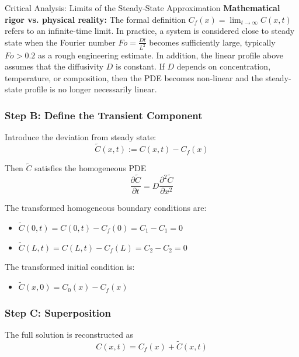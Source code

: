\begin{mainbox}{Critical Analysis: Limits of the Steady-State Approximation}
\textbf{Mathematical rigor vs. physical reality:} The formal definition $C_f(x)=\lim_{t\to\infty}C(x,t)$ refers to an infinite-time limit. In practice, a system is considered close to steady state when the Fourier number $Fo=\frac{Dt}{L^2}$ becomes sufficiently large, typically $Fo>0.2$ as a rough engineering estimate. In addition, the linear profile above assumes that the diffusivity $D$ is constant. If $D$ depends on concentration, temperature, or composition, then the PDE becomes non-linear and the steady-state profile is no longer necessarily linear.
\end{mainbox}

\subsubsection{Step B: Define the Transient Component}

Introduce the deviation from steady state:
\begin{equation}
    \tilde{C}(x,t):=C(x,t)-C_f(x)
\end{equation}

Then $\tilde{C}$ satisfies the homogeneous PDE
\begin{equation}
    \frac{\partial \tilde{C}}{\partial t}=D\frac{\partial^2 \tilde{C}}{\partial x^2}
\end{equation}

The transformed homogeneous boundary conditions are:
\begin{itemize}
    \item $\tilde{C}(0,t)=C(0,t)-C_f(0)=C_1-C_1=0$
    \item $\tilde{C}(L,t)=C(L,t)-C_f(L)=C_2-C_2=0$
\end{itemize}

The transformed initial condition is:
\begin{itemize}
    \item $\tilde{C}(x,0)=C_0(x)-C_f(x)$
\end{itemize}

\subsubsection{Step C: Superposition}

The full solution is reconstructed as
\begin{equation}
    C(x,t)=C_f(x)+\tilde{C}(x,t)
\end{equation}

